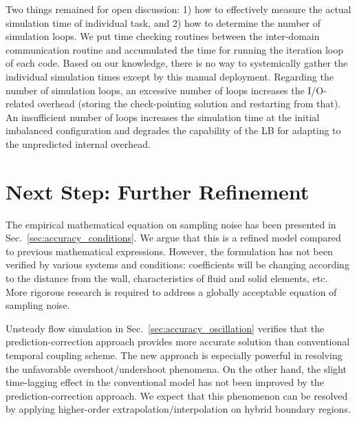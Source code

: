 \documentclass[preprint,12pt]{elsarticle}
\begin{document}

Two things remained for open discussion: 1) how to effectively measure the actual simulation time of individual task, and 2) how to determine the number of simulation loops. We put time checking routines between the inter-domain communication routine and accumulated the time for running the iteration loop of each code. Based on our knowledge, there is no way to systemically gather the individual simulation times except by this manual deployment. Regarding the number of simulation loops, an excessive number of loops increases the I/O-related overhead (storing the check-pointing solution and restarting from that). An insufficient number of loops increases the simulation time at the initial imbalanced configuration and degrades the capability of the LB for adapting to the unpredicted internal overhead.


\section{Next Step: Further Refinement}
\label{sec:futureworks}

The empirical mathematical equation on sampling noise has been presented in Sec.~\ref{sec:accuracy_conditions}. We argue that this is a refined model compared to previous mathematical expressions. However, the formulation has not been verified by various systems and conditions: coefficients will be changing according to the distance from the wall, characteristics of fluid and solid elements, etc. More rigorous research is required to address a globally acceptable equation of sampling noise.

Unsteady flow simulation in Sec.~\ref{sec:accuracy_oscillation} verifies that the prediction-correction approach provides more accurate solution than conventional temporal coupling scheme. The new approach is especially powerful in resolving the unfavorable overshoot/undershoot phenomena. On the other hand, the slight time-lagging effect in the conventional model has not been improved by the prediction-correction approach. We expect that this phenomenon can be resolved by applying higher-order extrapolation/interpolation on hybrid boundary regions.
\end{document}
